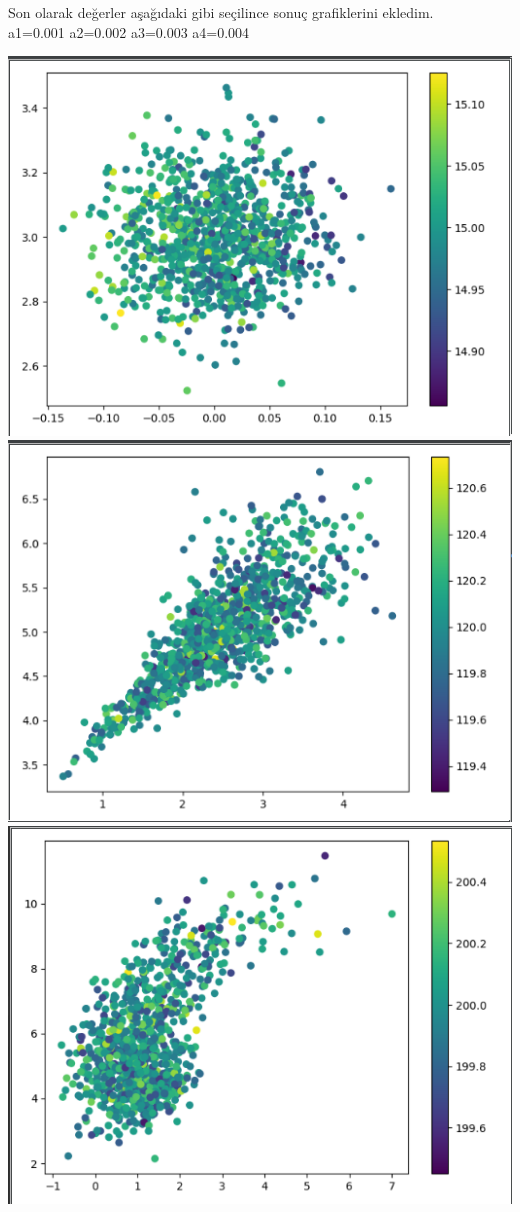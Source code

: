 \documentclass{article}
\begin{document}
		Son olarak değerler aşağıdaki gibi seçilince sonuç grafiklerini ekledim.\\
	a1=0.001 a2=0.002 a3=0.003 a4=0.004
		\begin{center}
		\includegraphics[scale=0.4]{step4}
		\includegraphics[scale=0.4]{step5}
		\includegraphics[scale=0.4]{step6}

\end{center}
\end{document}
